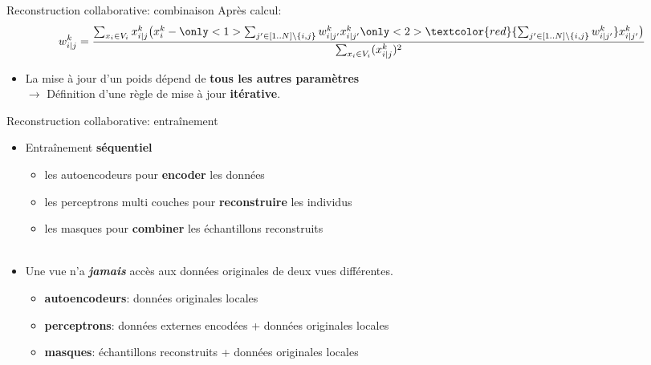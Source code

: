 \documentclass[hyperref={pdfpagelabels=false}]{beamer}
\begin{document}
    \begin{frame}{Reconstruction collaborative: combinaison}
        Après calcul:
        \begin{equation*}
            w_{i|j}^k = \frac{\sum_{x_i \in V_i} x_{i|j}^k\big(x_i^k - 
                    \only<1>{\sum_{j'\in[1..N]\backslash \{i,j\}} w_{i|j'}^k 
                    x_{i|j'}^k}\only<2>{\textcolor{red}{ 
                    \sum_{j'\in[1..N]\backslash \{i,j\}} w_{i|j'}^k} x_{i|j'}^k}
            \big)}{\sum_{x_i \in V_i}(x_{i|j}^k)^2}
        \end{equation*}
        \begin{itemize}
            \item<2> La mise à jour d'un poids dépend de \textbf{tous les autres 
                paramètres}\\$\rightarrow$ Définition d'une règle de mise à jour 
                \textbf{itérative}.
        \end{itemize}
    \end{frame}

    \begin{frame}{Reconstruction collaborative: entraînement}
        \begin{itemize}
            \item Entraînement \textbf{séquentiel}
                \begin{itemize}
                    \item les autoencodeurs pour \textbf{encoder} les données
                    \item les perceptrons multi couches pour 
                        \textbf{reconstruire} les individus
                    \item les masques pour \textbf{combiner} les échantillons 
                        reconstruits\\~\\
                \end{itemize}
            \item Une vue n'a \textbf{\textit{jamais}} accès aux données 
                originales de deux vues différentes.
                \begin{itemize}
                    \item \textbf{autoencodeurs}: données originales locales
                    \item \textbf{perceptrons}: données externes encodées + 
                        données originales locales
                    \item \textbf{masques}: échantillons reconstruits + données 
                        originales locales
                \end{itemize}
        \end{itemize}
    \end{frame}
\end{document}
